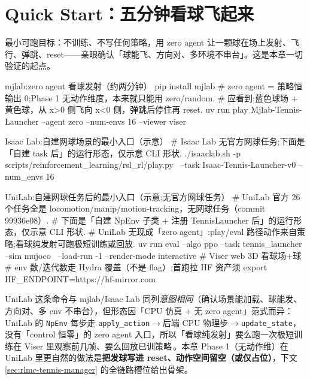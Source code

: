 \section*{Quick Start：五分钟看球飞起来}
\label{sec:rlmc-tennis-quickstart}

最小可跑目标：不训练、不写任何策略，用 zero agent 让一颗球在场上发射、飞行、弹跳、reset——亲眼确认「球能飞、方向对、多环境不串台」。这是本章一切验证的起点。

\begin{codebox}[bash]{mjlab:zero agent 看球发射（约两分钟）}
pip install mjlab
# zero agent = 策略恒输出 0;Phase 1 无动作维度，本来就只能用 zero/random.
# 应看到:蓝色球场 + 黄色球，从 x>0 侧飞向 x<0 侧，弹跳后停住再 reset.
uv run play Mjlab-Tennis-Launcher --agent zero --num-envs 16 --viewer viser
\end{codebox}

\begin{codebox}[bash]{Isaac Lab:自建网球场景的最小入口（示意）}
# Isaac Lab 无官方网球任务;下面是「自建 task 后」的运行形态，仅示意 CLI 形状.
./isaaclab.sh -p scripts/reinforcement_learning/rsl_rl/play.py \
  --task Isaac-Tennis-Launcher-v0 --num_envs 16
\end{codebox}

\begin{codebox}[bash]{UniLab:自建网球任务后的最小入口（示意;无官方网球任务）}
# UniLab 官方 26 个任务全是 locomotion/manip/motion-tracking，无网球任务（commit 99936e08）.
# 下面是「自建 NpEnv 子类 + 注册 TennisLauncher 后」的运行形态，仅示意 CLI 形状.
# UniLab 无现成「zero agent」:play/eval 路径动作来自策略;看球纯发射可跑极短训练或回放.
uv run eval --algo ppo --task tennis_launcher --sim mujoco \
    --load-run -1 --render-mode interactive   # Viser web 3D 看球场+球
# env 数/迭代数走 Hydra 覆盖（不是 flag）;首跑拉 HF 资产须 export HF_ENDPOINT=https://hf-mirror.com
\end{codebox}

UniLab 这条命令与 mjlab/Isaac Lab 同列\emph{意图相同}（确认场景能加载、球能发、方向对、多 env 不串台），但形态因「CPU 仿真 $+$ 无 zero agent」范式而异：UniLab 的 \verb|NpEnv| 每步走 \verb|apply_action|$\to$后端 CPU 物理步$\to$\verb|update_state|，没有「control 恒零」的 zero agent 入口，所以「看球纯发射」要么跑一次极短训练在 Viser 里观察前几帧、要么回放已训策略\,\cite{unilab2026}。本章 Phase 1（无动作维）在 UniLab 里更自然的做法是\textbf{把发球写进 reset、动作空间留空（或仅占位）}，下文 \cref{sec:rlmc-tennis-manager} 的全链路槽位给出骨架。

